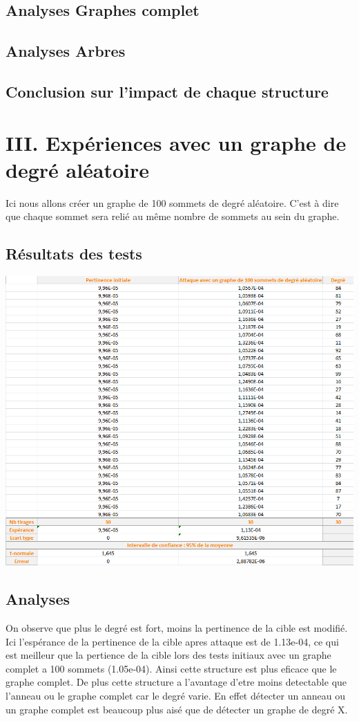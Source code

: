 \documentclass[a4paper,11pt]{article}
\begin{document}
	\subsection{Analyses Graphes complet}
		
	\subsection{Analyses Arbres}
		
	\subsection{Conclusion sur l'impact de chaque structure}

\section{III.	Expériences avec un graphe de degré aléatoire}
	Ici nous allons créer un graphe de 100 sommets de degré aléatoire. C'est à dire que chaque sommet sera relié au même nombre de sommets au sein du graphe.
	\subsection{Résultats des tests}
		\includegraphics[scale = 0.5]{Captures/ranking4.PNG}\\
		
	\subsection{Analyses}
		On observe que plus le degré est fort, moins la pertinence de la cible est modifié. Ici l'espérance de la pertinence de la cible apres attaque est de 1.13e-04, ce qui est 
		meilleur que la pertience de la cible lors des tests initiaux avec un graphe complet a 100 sommets (1.05e-04). Ainsi cette structure est plus eficace que le graphe complet.
		De plus cette structure a l'avantage d'etre moins detectable que l'anneau ou le graphe complet car le degré varie. En effet détecter un anneau ou un graphe complet est beaucoup plus aisé 
		que de détecter un graphe de degré X.
	
\end{document}
